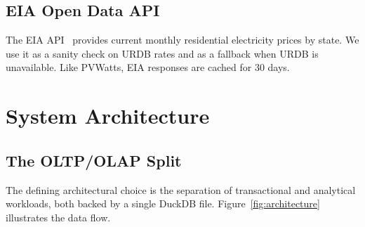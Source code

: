 \documentclass[10pt, conference]{IEEEtran}
\begin{document}
\subsection{EIA Open Data API}

The EIA API~\cite{EIA2026} provides current monthly residential electricity prices by state. We use it as a sanity check on URDB rates and as a fallback when URDB is unavailable. Like PVWatts, EIA responses are cached for 30 days.

\section{System Architecture}

\subsection{The OLTP/OLAP Split}

The defining architectural choice is the separation of transactional and analytical workloads, both backed by a single DuckDB file. Figure~\ref{fig:architecture} illustrates the data flow.
\end{document}
